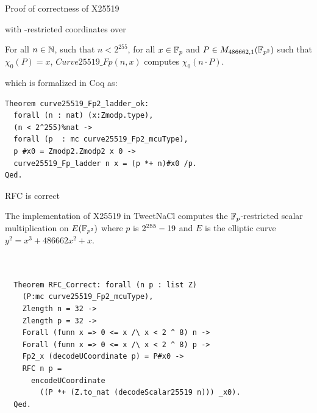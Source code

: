 \documentclass[8pt,aspectratio=169]{beamer}
\begin{document}
\begin{frame}[fragile]{Proof of correctness of X25519}
\end{frame}

%
%
\begin{frame}[fragile]{with -restricted coordinates over }
	\begin{theorem}
		\label{thm:general-scalarmult}
		For all $n \in \mathbb{N}$, such that $n < 2^{255}$,
		for all $x \in \mathbb{F}_{p}$ and $P \in M_{486662,1}(\mathbb{F}_{p^2})$ such that $\chi_0(P) = x$,
		$Curve25519\_Fp(n,x)$ computes $\chi_0(n \cdot P)$.
	\end{theorem}
	which is formalized in Coq as:
	\begin{lstlisting}[language=Coq, basicstyle=\normalsize]
Theorem curve25519_Fp2_ladder_ok:
  forall (n : nat) (x:Zmodp.type),
  (n < 2^255)%nat ->
  forall (p  : mc curve25519_Fp2_mcuType),
  p #x0 = Zmodp2.Zmodp2 x 0 ->
  curve25519_Fp_ladder n x = (p *+ n)#x0 /p.
Qed.
\end{lstlisting}

\end{frame}


%
%
\begin{frame}[fragile]{RFC is correct}
	\begin{informaltheorem}
		The implementation of X25519 in TweetNaCl computes the
		$\mathbb{F}_{p}$-restricted \xcoord scalar multiplication on $E(\mathbb{F}_{p^2})$ where $p$ is $2^{255}-19$
		and $E$ is the elliptic curve $y^2 = x^3 + 486662 x^2 + x$.
	\end{informaltheorem}

	\begin{lstlisting}[language=Coq, basicstyle=\normalsize]


  Theorem RFC_Correct: forall (n p : list Z)
    (P:mc curve25519_Fp2_mcuType),
    Zlength n = 32 ->
    Zlength p = 32 ->
    Forall (funn x => 0 <= x /\ x < 2 ^ 8) n ->
    Forall (funn x => 0 <= x /\ x < 2 ^ 8) p ->
    Fp2_x (decodeUCoordinate p) = P#x0 ->
    RFC n p =
      encodeUCoordinate
        ((P *+ (Z.to_nat (decodeScalar25519 n))) _x0).
  Qed.
  \end{lstlisting}
\end{frame}
\end{document}
